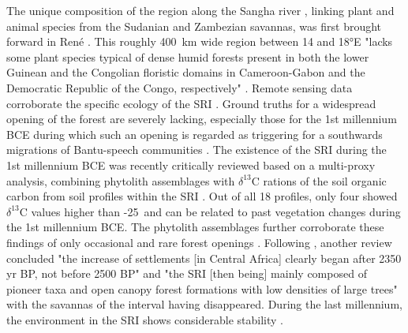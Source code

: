 \documentclass[smallextended,natbib]{svjour3}       %
\begin{document}
The unique composition of the region along the Sangha river \citep[cf. "W\&E margins" in][7 Fig.~3A]{Philippon.2019}, linking plant and animal species from the Sudanian and Zambezian savannas, was first brought forward in René \citet{Letouzey.1968}. This roughly 400~km wide region between 14 and 18°E "lacks some plant species typical of dense humid forests present in both the lower Guinean and the Congolian floristic domains in Cameroon-Gabon and the Democratic Republic of the Congo, respectively" \citep[356]{Bostoen.2015}. Remote sensing data corroborate the specific ecology of the SRI \citep{Gond.2013,Philippon.2019}. Ground truths for a widespread opening of the forest are severely lacking, especially those for the 1st millennium BCE during which such an opening is regarded as triggering for a southwards migrations of Bantu-speech communities \citep{Grollemund.2015,Bostoen.2015}. The existence of the SRI during the 1st millennium BCE was recently critically reviewed based on a multi-proxy analysis, combining phytolith assemblages with $\delta^{13}$C rations of the soil organic carbon from soil profiles within the SRI \citep{Bremond.2017}. Out of all 18 profiles, only four showed $\delta^{13}$C values higher than -25\textperthousand\ and can be related to past vegetation changes during the 1st millennium BCE. The phytolith assemblages further corroborate these findings of only occasional and rare forest openings \citep[99]{Bremond.2017}. Following \citet{Bremond.2017}, another review concluded "the increase of settlements [in Central Africa] clearly began after 2350 yr BP, not before 2500 BP" \citep[1]{Giresse.2020} and "the SRI [then being] mainly composed of pioneer taxa and open canopy forest formations with low densities of large trees" \citep[11]{Giresse.2020} with the savannas of the interval having disappeared. During the last millennium, the environment in the SRI shows considerable stability \citep{Giresse.2023}.
\end{document}

